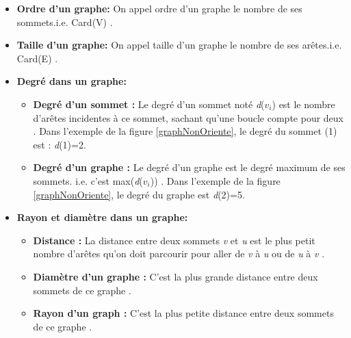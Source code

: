 		\begin{itemize}[label=$\circ$]
			
			\item \textbf{Ordre d'un graphe:} On appel ordre d’un 					graphe le nombre de ses sommets.i.e. Card(V) \citep{DUT}.
			
			\item  \textbf{Taille d'un graphe:} On appel taille d’un 				graphe le nombre de ses arêtes.i.e. Card(E) \citep{DUT}.
			
			\item  \textbf{Degré dans un graphe:}
			
			
			\begin{itemize}[label=$\bullet$]
				\item \textbf{Degré d'un sommet : } Le degré d’un sommet noté \textit{d}($\textit{v}_{i}$) est le nombre d'arêtes incidentes à ce sommet, sachant qu’une boucle compte pour deux \citep{muller}. Dans l'exemple de la figure \ref{graphNonOriente}, le degré du sommet (1) est : \textit{d}(1)=2.
				
				\item \textbf{Degré d'un graphe : }Le degré d’un graphe est le degré maximum de ses sommets. i.e. c’est 						max(\textit{d}($\textit{v}_{i}$)) \citep{muller}. Dans l’exemple de 				la figure \ref{graphNonOriente}, le degré du graphe est \textit{d}(2)=5.
			\end{itemize}
			
			\item \textbf{Rayon et diamètre dans un graphe:}
			\begin{itemize}[label=$\bullet$]
				\item \textbf{Distance : }La distance entre deux sommets 	\textit{v} et \textit{u} est le plus petit nombre d’arêtes qu’on doit parcourir pour aller de \textit{v} à \textit{u} ou de \textit{u} à \textit{v} \citep{muller}. 
				
				\item 	\textbf{Diamètre d’un graphe :} C’est la plus grande 	distance entre deux sommets de ce graphe \citep{muller}. 
				
				\item 	\textbf{Rayon d’un graph : }C’est la plus petite distance entre deux sommets de ce graphe \citep{parlebas1972centralite}. 
			\end{itemize}
		\end{itemize}
		
	
			
	